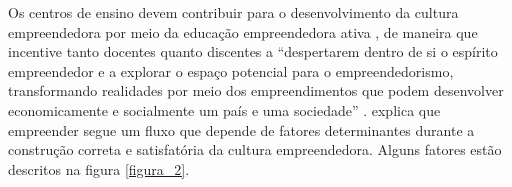 






Os centros de ensino devem contribuir para o desenvolvimento da cultura empreendedora por meio da educação empreendedora ativa \cite{tscha_empreendendo_2014}, de maneira que incentive tanto docentes quanto discentes a “despertarem dentro de si o espírito empreendedor e a explorar o espaço potencial para o empreendedorismo, transformando realidades por meio dos empreendimentos que podem desenvolver economicamente e socialmente um país e uma sociedade” \cite{tscha_empreendendo_2014}. \cite{dornelas_empreendedorismo_2005} explica que empreender segue um fluxo que depende de fatores determinantes durante a construção correta e satisfatória da cultura empreendedora. Alguns fatores estão descritos na figura \ref{figura_2}.


